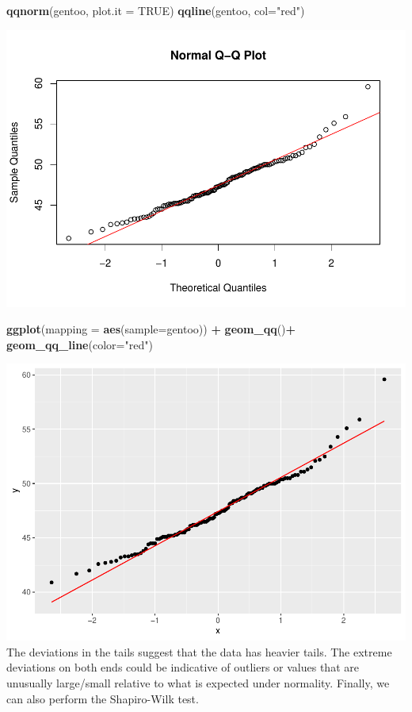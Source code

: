 \documentclass[
]{article}
\newenvironment{Shaded}{\begin{snugshade}}{\end{snugshade}}
\newcommand{\AttributeTok}[1]{\textcolor[rgb]{0.13,0.29,0.53}{#1}}
\newcommand{\ConstantTok}[1]{\textcolor[rgb]{0.56,0.35,0.01}{#1}}
\newcommand{\FunctionTok}[1]{\textcolor[rgb]{0.13,0.29,0.53}{\textbf{#1}}}
\newcommand{\NormalTok}[1]{#1}
\newcommand{\SpecialCharTok}[1]{\textcolor[rgb]{0.81,0.36,0.00}{\textbf{#1}}}
\newcommand{\StringTok}[1]{\textcolor[rgb]{0.31,0.60,0.02}{#1}}
\begin{document}
\begin{Shaded}
\begin{Highlighting}[]
\FunctionTok{qqnorm}\NormalTok{(gentoo, }\AttributeTok{plot.it =} \ConstantTok{TRUE}\NormalTok{)}
\FunctionTok{qqline}\NormalTok{(gentoo, }\AttributeTok{col=}\StringTok{"red"}\NormalTok{)}
\end{Highlighting}
\end{Shaded}

\includegraphics{Tests_and_Applications_files/figure-latex/unnamed-chunk-10-1.pdf}

\begin{Shaded}
\begin{Highlighting}[]
\FunctionTok{ggplot}\NormalTok{(}\AttributeTok{mapping =} \FunctionTok{aes}\NormalTok{(}\AttributeTok{sample=}\NormalTok{gentoo)) }\SpecialCharTok{+} 
  \FunctionTok{geom\_qq}\NormalTok{()}\SpecialCharTok{+}
  \FunctionTok{geom\_qq\_line}\NormalTok{(}\AttributeTok{color=}\StringTok{"red"}\NormalTok{)}
\end{Highlighting}
\end{Shaded}

\includegraphics{Tests_and_Applications_files/figure-latex/unnamed-chunk-11-1.pdf}
The deviations in the tails suggest that the data has heavier tails. The
extreme deviations on both ends could be indicative of outliers or
values that are unusually large/small relative to what is expected under
normality. Finally, we can also perform the Shapiro-Wilk test.
\end{document}
